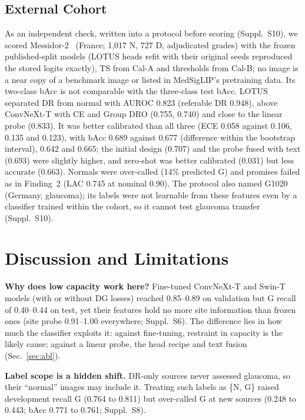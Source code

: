 \documentclass[runningheads]{llncs}
\newcommand{\sups}[1]{Suppl.~S#1}
\begin{document}
\subsection{External Cohort}\label{sec:ext}
As an independent check, written into a protocol before scoring (\sups{10}), we scored Messidor-2~\cite{messidor2} (France; 1,017 N, 727 D, adjudicated grades) with the frozen published-split models (LOTUS heads refit with their original seeds reproduced the stored logits exactly), TS from Cal-A and thresholds from Cal-B; no image is a near copy of a benchmark image or listed in MedSigLIP's pretraining data. Its two-class bAcc is not comparable with the three-class test bAcc.
LOTUS separated DR from normal with AUROC 0.823 (referable DR 0.948), above ConvNeXt-T with CE and Group DRO (0.755, 0.740) and close to the linear probe (0.833). It was better calibrated than all three (ECE 0.058 against 0.106, 0.135 and 0.123), with bAcc 0.689 against 0.677 (difference within the bootstrap interval), 0.642 and 0.665; the initial design (0.707) and the probe fused with text (0.693) were slightly higher, and zero-shot was better calibrated (0.031) but less accurate (0.663). Normals were over-called (14\% predicted G) and promises failed as in Finding~2 (LAC 0.745 at nominal 0.90). The protocol also named G1020 (Germany, glaucoma); its labels were not learnable from these features even by a classifier trained within the cohort, so it cannot test glaucoma transfer (\sups{10}).

\section{Discussion and Limitations}\label{sec:disc}
\textbf{Why does low capacity work here?} Fine-tuned ConvNeXt-T and Swin-T models (with or without DG losses) reached 0.85--0.89 on validation but G recall of 0.40--0.44 on test, yet their features hold no more site information than frozen ones (site probe 0.91--1.00 everywhere; \sups{6}). The difference lies in how much the classifier exploits it: against fine-tuning, restraint in capacity is the likely cause; against a linear probe, the head recipe and text fusion (Sec.~\ref{sec:abl}).

\textbf{Label scope is a hidden shift.} DR-only sources never assessed glaucoma, so their ``normal'' images may include it. Treating such labels as \{N, G\} raised development recall G (0.764 to 0.811) but over-called G at new sources (0.248 to 0.443; bAcc 0.771 to 0.761; \sups{8}).
\end{document}

